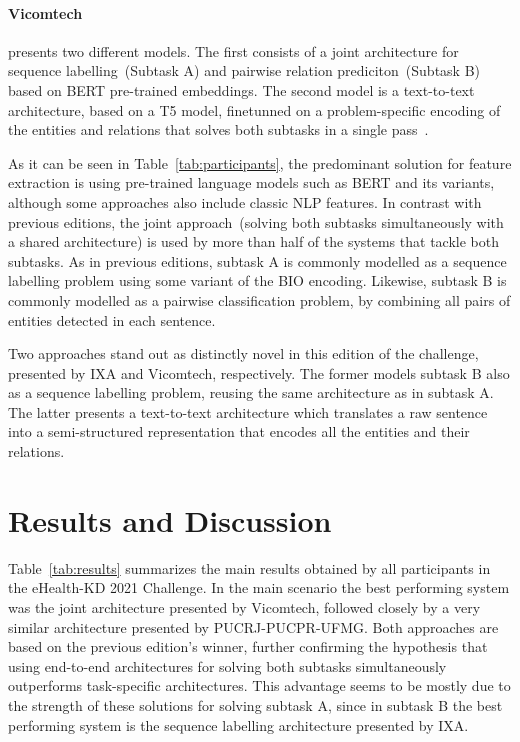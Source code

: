 \documentclass[a4paper,11pt,twocolumn,twoside]{article}
\begin{document}
  \paragraph{Vicomtech} presents two different models. The first consists of a joint architecture for sequence labelling~(Subtask A) and pairwise relation prediciton~(Subtask B) based on BERT pre-trained embeddings. The second model is a text-to-text architecture, based on a T5 model, finetunned on a problem-specific encoding of the entities and relations that solves both subtasks in a single pass~\cite{vicomtech2021}.

As it can be seen in Table~\ref{tab:participants}, the predominant solution for feature extraction is using pre-trained language models such as BERT and its variants, although some approaches also include classic NLP features.
In contrast with previous editions, the joint approach~(solving both subtasks simultaneously with a shared architecture) is used by more than half of the systems that tackle both subtasks.
As in previous editions, subtask A is commonly modelled as a sequence labelling problem using some variant of the BIO encoding.
Likewise, subtask B is commonly modelled as a pairwise classification problem, by combining all pairs of entities detected in each sentence.

Two approaches stand out as distinctly novel in this edition of the challenge, presented by IXA and Vicomtech, respectively.
The former models subtask B also as a sequence labelling problem, reusing the same architecture as in subtask A.
The latter presents a text-to-text architecture which translates a raw sentence into a semi-structured representation that encodes all the entities and their relations.

\section{Results and Discussion}\label{sec:results}

Table~\ref{tab:results} summarizes the main results obtained by all participants in the eHealth-KD 2021 Challenge.
In the main scenario the best performing system was the joint architecture presented by Vicomtech, followed closely by a very similar architecture presented by PUCRJ-PUCPR-UFMG.
Both approaches are based on the previous edition's winner, further confirming the hypothesis that using end-to-end architectures for solving both subtasks simultaneously outperforms task-specific architectures.
This advantage seems to be mostly due to the strength of these solutions for solving subtask A, since in subtask B the best performing system is the sequence labelling architecture presented by IXA.
\end{document}

